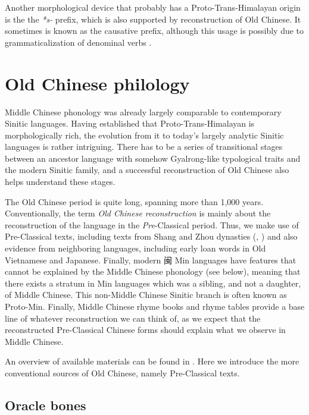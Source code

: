 \documentclass[UTF8, a4paper, oneside, scheme=plain, 12pt]{ctexrep}
\newcommand*{\citechap}[1]{Ch.~{#1}}
\newcommand*{\term}[1]{\emph{#1}}
\newcommand{\form}[1]{\emph{#1}}
\begin{document}
Another morphological device that probably has a Proto-Trans-Himalayan origin is the the \form{*s-} prefix,
which is also supported by reconstruction of Old Chinese.
It sometimes is known as the causative prefix,
although this usage is possibly due to grammaticalization of denominal verbs
\citep{jacques2015origin}.

\chapter{Old Chinese philology}

Middle Chinese phonology was already largely comparable to contemporary Sinitic languages.
Having established that Proto-Trans-Himalayan is morphologically rich,
the evolution from it to today's largely analytic Sinitic languages is rather intriguing.
There has to be a series of transitional stages between an ancestor language with somehow Gyalrong-like typological traits and the modern Sinitic family,
and a successful reconstruction of Old Chinese also helps understand these stages.

The Old Chinese period is quite long, spanning more than 1,000 years.
Conventionally, the term \term{Old Chinese reconstruction} is mainly about the reconstruction of the language in the \emph{Pre}-Classical period.
Thus, we make use of Pre-Classical texts, including texts from Shang and Zhou dynasties (, ) and also evidence from neighboring languages,
including early loan words in Old Vietnamese and Japanese.
Finally, modern 闽 Min languages have features that cannot be explained by
the Middle Chinese phonology (see below),
meaning that there exists a stratum in Min languages
which was a sibling, and not a daughter, of Middle Chinese.
This non-Middle Chinese Sinitic branch is often known as Proto-Min.
Finally, Middle Chinese rhyme books and rhyme tables provide a base line
of whatever reconstruction we can think of,
as we expect that the reconstructed Pre-Classical Chinese forms
should explain what we observe in Middle Chinese.

An overview of available materials can be found in \citet[\citechap{2}]{baxter2014old}.
Here we introduce the more conventional sources of Old Chinese,
namely Pre-Classical texts.

\section{Oracle bones}\label{sec:intro.pre-classical.shang}
\end{document}
